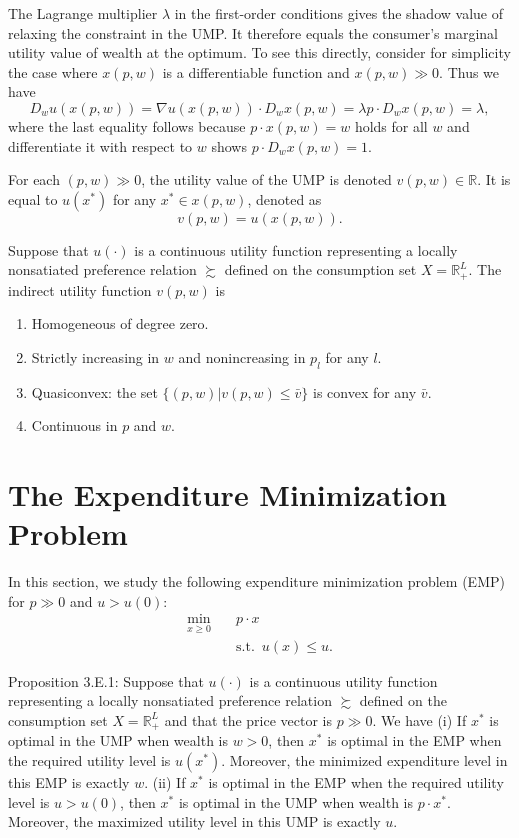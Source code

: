 \documentclass[11pt,fleqn]{book} %
\begin{document}
The Lagrange multiplier $\lambda$ in the first-order conditions gives
the shadow value of relaxing the constraint in the UMP. It therefore equals the consumer's marginal utility value of wealth at the optimum.
To see this directly, consider for simplicity the case where $x(p, w)$
is a differentiable function and $x(p, w) \gg 0$. Thus we have
\[
D_wu(x(p,w))=\nabla u(x(p,w))\cdot D_wx(p,w)=\lambda p\cdot D_wx(p,w)=\lambda,
\]
where the last equality follows because $p\cdot x(p, w) = w$ holds for all $w$ and differentiate it with respect to $w$ shows $p\cdot D_wx(p,w)= 1$.

\begin{definition}
	For each $(p, w) \gg 0$, the utility value of the UMP is denoted $v(p, w)\in \mathbb{R}$. It is equal to $u(x^*)$ for any $x^*\in x(p, w)$, denoted as
	\[
	v(p, w)=u(x(p, w)).
	\]
	
\end{definition}


\begin{proposition}
Suppose that $u(\cdot)$ is a continuous utility function representing a
locally nonsatiated preference relation $\succsim$ defined on the consumption set $X=\mathbb{R}_+^L$. The indirect utility function $v(p, w)$ is	
\begin{enumerate}
	\item Homogeneous of degree zero.
	\item Strictly increasing in $w$ and nonincreasing in $p_l$ for any $l$.
	\item Quasiconvex: the set $\{(p, w)| v(p, w)\le \bar{v}\}$ is convex for any $\bar{v}$.
	\item Continuous in $p$ and $w$. 
\end{enumerate}
\end{proposition}

\section{The Expenditure Minimization Problem}

In this section, we study the following expenditure minimization problem (EMP) for
$p\gg 0$ and $u > u(0)$:
\begin{align*}
\min_{x\ge 0} \quad &  p\cdot x\\
& \mathrm{s.t.}\ \; u(x)\le u.
\end{align*}


\begin{proposition}
Proposition 3.E.1: Suppose that $u(\cdot)$ is a continuous utility function representing a locally nonsatiated preference relation $\succsim$ defined on the consumption set $X=\mathbb{R}_+^L$ and that the price vector is $p \gg 0$. We have
(i) If $x^*$ is optimal in the UMP when wealth is $w > 0$, then $x^*$ is optimal in the
EMP when the required utility level is $u(x^*)$. Moreover, the minimized
expenditure level in this EMP is exactly $w$.
(ii) If $x^*$ is optimal in the EMP when the required utility level is $u > u(0)$, then $x^*$ is optimal in the UMP when wealth is $p\cdot x^*$. Moreover, the maximized
utility level in this UMP is exactly $u$.

\end{proposition}
\end{document}
